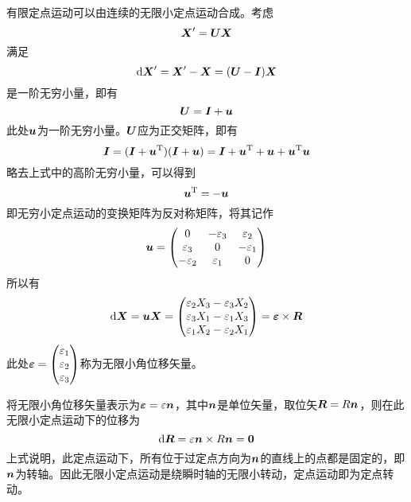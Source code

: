 有限定点运动可以由连续的无限小定点运动合成。考虑
\begin{equation*}
	\boldsymbol{X}' = \boldsymbol{U}\boldsymbol{X}
\end{equation*}
满足
\begin{equation*}
	\mathrm{d} \boldsymbol{X}' = \boldsymbol{X}' - \boldsymbol{X} = (\boldsymbol{U}-\boldsymbol{I}) \boldsymbol{X}
\end{equation*}
是一阶无穷小量，即有
\begin{equation*}
	\boldsymbol{U} = \boldsymbol{I}+\boldsymbol{u}
\end{equation*}
此处$\boldsymbol{u}$为一阶无穷小量。$\boldsymbol{U}$应为正交矩阵，即有
\begin{equation*}
	\boldsymbol{I} = (\boldsymbol{I}+\boldsymbol{u}^{\mathrm{T}})(\boldsymbol{I}+\boldsymbol{u}) = \boldsymbol{I} + \boldsymbol{u}^{\mathrm{T}} + \boldsymbol{u} + \boldsymbol{u}^{\mathrm{T}} \boldsymbol{u}
\end{equation*}
略去上式中的高阶无穷小量，可以得到
\begin{equation}
	\boldsymbol{u}^{\mathrm{T}} = -\boldsymbol{u}
\end{equation}
即无穷小定点运动的变换矩阵为反对称矩阵，将其记作
\begin{equation*}
	\boldsymbol{u} = \begin{pmatrix} 0 & -\varepsilon_3 & \varepsilon_2 \\ \varepsilon_3 & 0 & -\varepsilon_1 \\ -\varepsilon_2 & \varepsilon_1 & 0 \end{pmatrix}
\end{equation*}
所以有
\begin{equation*}
	\mathrm{d} \boldsymbol{X} = \boldsymbol{u} \boldsymbol{X} = \begin{pmatrix} \varepsilon_2 X_3 - \varepsilon_3 X_2 \\ \varepsilon_3 X_1 - \varepsilon_1 X_3 \\ \varepsilon_1 X_2 - \varepsilon_2 X_1 \end{pmatrix} = \boldsymbol{\varepsilon} \times \boldsymbol{R}
\end{equation*}
此处$\boldsymbol{\varepsilon} = \begin{pmatrix} \varepsilon_1 \\ \varepsilon_2 \\ \varepsilon_3 \end{pmatrix}$称为{\heiti 无限小角位移矢量}。

将无限小角位移矢量表示为$\boldsymbol{\varepsilon} = \varepsilon \boldsymbol{n}$，其中$\boldsymbol{n}$是单位矢量，取位矢$\boldsymbol{R} = R\boldsymbol{n}$，则在此无限小定点运动下的位移为
\begin{equation*}
	\mathrm{d} \boldsymbol{R} = \varepsilon \boldsymbol{n} \times R\boldsymbol{n} = \boldsymbol{0}
\end{equation*}
上式说明，此定点运动下，所有位于过定点方向为$\boldsymbol{n}$的直线上的点都是固定的，即$\boldsymbol{n}$为转轴。因此无限小定点运动是绕瞬时轴的无限小转动，定点运动即为{\heiti 定点转动}。

